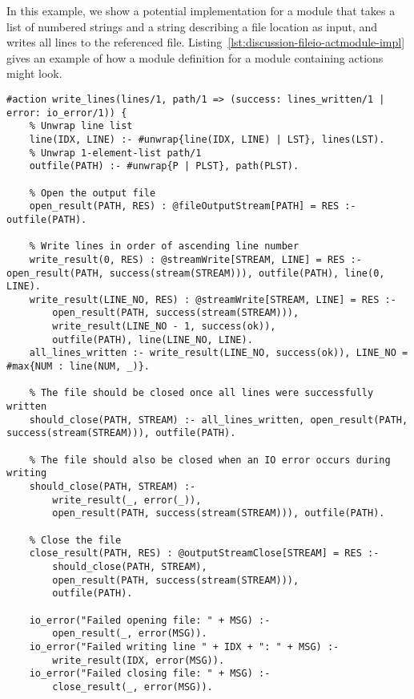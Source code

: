 \begin{example}
In this example, we show a potential implementation for a module that takes a list of numbered strings and a string describing a file location as input, and writes all lines to the referenced file. Listing~\ref{lst:discussion-fileio-actmodule-impl} gives an example of how a module definition for a module containing actions might look.
\begin{lstlisting}[style=asp-code, label={lst:discussion-fileio-actmodule-impl}, caption={Prototypical definition of a module containing Evolog actions.}]
#action write_lines(lines/1, path/1 => (success: lines_written/1 | error: io_error/1)) {
	% Unwrap line list
	line(IDX, LINE) :- #unwrap{line(IDX, LINE) | LST}, lines(LST).
	% Unwrap 1-element-list path/1
	outfile(PATH) :- #unwrap{P | PLST}, path(PLST).
	
	% Open the output file
	open_result(PATH, RES) : @fileOutputStream[PATH] = RES :- outfile(PATH).

	% Write lines in order of ascending line number
	write_result(0, RES) : @streamWrite[STREAM, LINE] = RES :- open_result(PATH, success(stream(STREAM))), outfile(PATH), line(0, LINE).
	write_result(LINE_NO, RES) : @streamWrite[STREAM, LINE] = RES :-  
		open_result(PATH, success(stream(STREAM))), 
		write_result(LINE_NO - 1, success(ok)), 
		outfile(PATH), line(LINE_NO, LINE).
	all_lines_written :- write_result(LINE_NO, success(ok)), LINE_NO = #max{NUM : line(NUM, _)}.
		
	% The file should be closed once all lines were successfully written	
	should_close(PATH, STREAM) :- all_lines_written, open_result(PATH, success(stream(STREAM))), outfile(PATH).

	% The file should also be closed when an IO error occurs during writing
	should_close(PATH, STREAM) :- 
		write_result(_, error(_)),
		open_result(PATH, success(stream(STREAM))), outfile(PATH).

	% Close the file
	close_result(PATH, RES) : @outputStreamClose[STREAM] = RES :- 
		should_close(PATH, STREAM), 
		open_result(PATH, success(stream(STREAM))), 
		outfile(PATH).

	io_error("Failed opening file: " + MSG) :-
		open_result(_, error(MSG)).
	io_error("Failed writing line " + IDX + ": " + MSG) :-
		write_result(IDX, error(MSG)).
	io_error("Failed closing file: " + MSG) :-
		close_result(_, error(MSG)).


\end{lstlisting}
\end{example}
